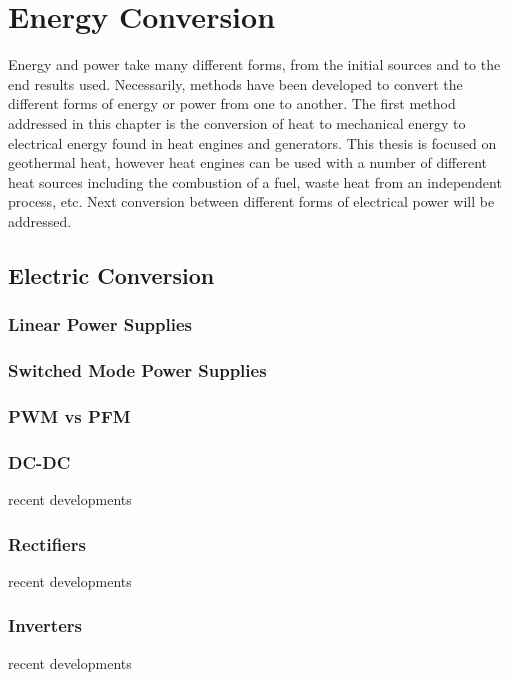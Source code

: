 \chapter{Energy Conversion}
\label{ch:conv}

Energy and power take many different forms, from the initial sources and to the end results used. Necessarily, methods have been developed to convert the different forms of energy or power from one to another. The first method addressed in this chapter is the conversion of heat to mechanical energy to electrical energy found in heat engines and generators. This thesis is focused on geothermal heat, however heat engines can be used with a number of different heat sources including the combustion of a fuel, waste heat from an independent process, etc. Next conversion between different forms of electrical power will be addressed.


\section{Electric Conversion}

\subsection{Linear Power Supplies}

\subsection{Switched Mode Power Supplies}

\subsection{PWM vs PFM}

\subsection{DC-DC}
recent developments

\subsection{Rectifiers}
recent developments

\subsection{Inverters}
recent developments
